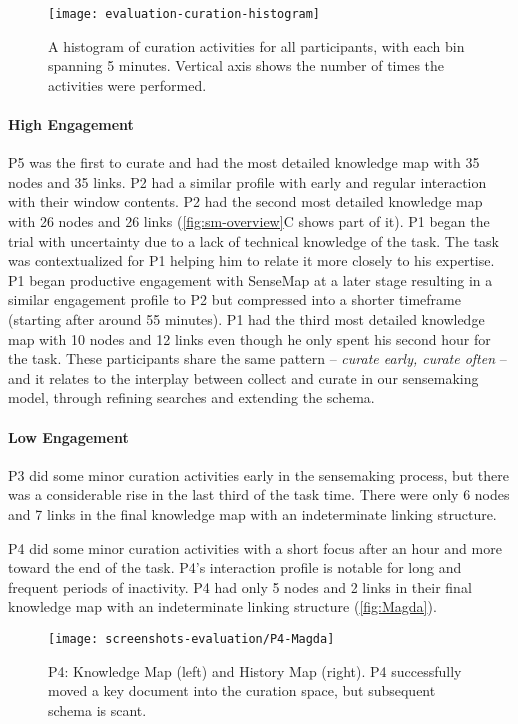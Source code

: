 \begin{figure}
	\centering
	\texttt{[image: evaluation-curation-histogram]}
	\caption[A histogram of curation activities for all participants]{A histogram of curation activities for all participants, with each bin spanning  5 minutes. Vertical axis shows the number of times the activities were performed.}
	\label{fig:evaluation-curation-histogram}
\end{figure}

\paragraph{High Engagement}
P5 was the first to curate and had the most detailed knowledge map with 35 nodes and 35 links. P2 had a similar profile with early and regular interaction with their window contents. P2 had the second most detailed knowledge map with 26 nodes and 26 links (\autoref{fig:sm-overview}C shows part of it). P1 began the trial with uncertainty due to a lack of technical knowledge of the task. The task was contextualized for P1 helping him to relate it more closely to his expertise. P1 began productive engagement with SenseMap at a later stage resulting in a similar engagement profile to P2 but compressed into a shorter timeframe (starting after around 55 minutes). P1 had the third most detailed knowledge map with 10 nodes and 12 links even though he only spent his second hour for the task. These participants share the same pattern --  \textit{curate early, curate often} -- and it relates to the interplay between collect and curate in our sensemaking model, through refining searches and extending the schema.

\paragraph{Low Engagement}
P3 did some minor curation activities early in the sensemaking process, but there was a considerable rise in the last third of the task time. There were only 6 nodes and 7 links in the final knowledge map with an indeterminate linking structure.

P4 did some minor curation activities with a short focus after an hour and more toward the end of the task. P4's interaction profile is notable for long and frequent periods of inactivity. P4 had only 5 nodes and 2 links in their final knowledge map with an indeterminate linking structure (\autoref{fig:Magda}).

\begin{figure}
	\centering
	\texttt{[image: screenshots-evaluation/P4-Magda]}
	\caption[Knowledge map and history map of P4]{P4: Knowledge Map (left) and History Map (right). P4 successfully moved a key document into the curation space, but subsequent schema is scant.}
	\label{fig:Magda}
\end{figure}

